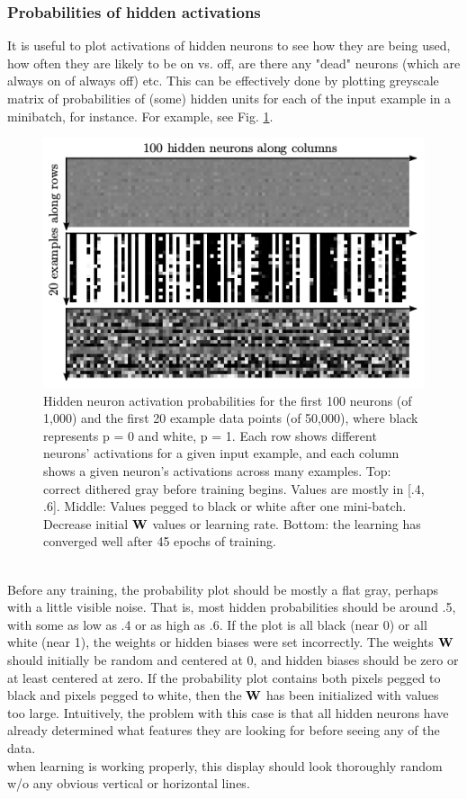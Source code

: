 \subsubsection{Probabilities of hidden activations}
It is useful to plot activations of hidden neurons to see how they are being used, how often they are likely to be on vs. off, are there any "dead" neurons (which are always on of always off) etc. This can be effectively done by plotting greyscale matrix of probabilities of (some) hidden units for each of the input example in a minibatch, for instance. For example, see Fig. \ref{fig:rbm_hidden_activations}.
\begin{figure}[h]
\begin{mdframed}
\includegraphics[scale=0.64]{img/rbm_hidden_activations.png}
\centering
\caption{Hidden neuron activation probabilities for the first 100 neurons (of 1,000) and the first 20 example data points (of 50,000), where black represents p = 0 and white, p = 1. Each row shows different neurons’ activations for a given input example, and each column shows a given neuron’s activations across many examples. Top: correct dithered gray before training begins. Values are mostly in [.4, .6]. Middle: Values pegged to black or white after one mini-batch. Decrease initial $\mathbf{W}$ values or learning rate. Bottom: the learning has converged well after 45 epochs of
training.}
\label{fig:rbm_hidden_activations}
\end{mdframed}
\end{figure}
\\[1em]Before any training, the probability plot should be mostly a flat gray, perhaps with a little visible noise. That is, most hidden probabilities should be around .5, with some as low as .4 or as high as .6. If the plot is all black (near 0) or all white (near 1), the weights or hidden biases were set incorrectly. The weights $\mathbf{W}$ should initially be random and centered at 0, and hidden biases should be zero or at least centered at zero. If the probability plot contains both pixels pegged to black and pixels pegged to white, then the $\mathbf{W}$ has been initialized with values too large. Intuitively, the problem with this case is that all hidden neurons have already determined what features they are looking for before seeing any of the data. 
\\
 when learning is working properly, this display should look thoroughly random w/o any obvious vertical or horizontal lines.

